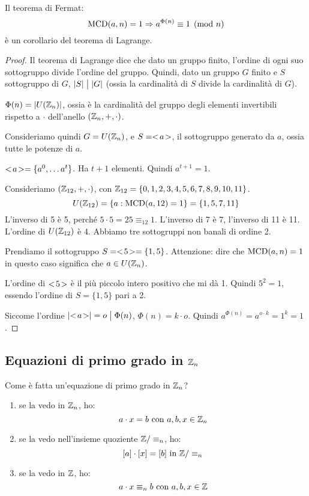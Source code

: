 \begin{prop}
Il teorema di Fermat:
\[
\operatorname{MCD}(a, n) = 1 \Rightarrow a^{\Phi(n)} \equiv 1 \pmod{n}
\]
\`e un corollario del teorema di Lagrange.
\end{prop}
\begin{proof}
Il teorema di Lagrange dice che dato un gruppo finito, l'ordine di ogni suo sottogruppo divide l'ordine del gruppo. Quindi, dato un gruppo $G$ finito e $S$ sottogruppo di $G$, $\left\lvert{S}\right\rvert \bigm| \left\lvert{G}\right\rvert $ (ossia la cardinalit\`a di $S$ divide la cardinalit\`a di $G$).

$\Phi(n) = \left\lvert{U(\mathbb{Z}_n)}\right\rvert$, ossia \`e la cardinalit\`a del gruppo degli elementi invertibili rispetto a $\cdot$ dell'anello $(\mathbb{Z}_n, +, \cdot)$.

Consideriamo quindi $G = U(\mathbb{Z}_n)$, e $S = <\!{a}\!>$, il sottogruppo generato da $a$, ossia tutte le potenze di $a$.

$<\!{a}\!> = \{ a^0, \dots a^t \}$. Ha $t + 1$ elementi. Quindi $a^{t+1} = 1$.

Consideriamo $(\mathbb{Z}_{12}, +, \cdot)$, con $\mathbb{Z}_{12} = \{0,1,2,3,4,5,6,7,8,9,10,11\}$.
\[
U(\mathbb{Z}_{12}) = \{ a : \operatorname{MCD}(a, 12) = 1\} = \{ 1, 5, 7, 11 \}
\]
L'inverso di 5 \`e 5, perch\'e $5 \cdot 5 = 25 \equiv_{12} 1$. L'inverso di 7 \`e 7, l'inverso di 11 \`e 11. L'ordine di $U(\mathbb{Z}_{12})$ \`e 4. Abbiamo tre sottogruppi non banali di ordine 2.

Prendiamo il sottogruppo $S = <\!{5}\!> = \{ 1, 5 \}$. Attenzione: dire che $\operatorname{MCD}(a, n) = 1$ in questo caso significa che $a \in U(\mathbb{Z}_n)$.

L'ordine di $<\!{5}\!>$ \`e il pi\`u piccolo intero positivo che mi d\`a 1. Quindi $5^2 = 1$, essendo l'ordine di $S = \{ 1, 5 \}$ pari a 2.

Siccome l'ordine $\left\lvert{<\!{a}\!>}\right\rvert = o \bigm| \Phi(n)$, $\Phi(n) = k \cdot o$. Quindi $a^{\Phi(n)} = a^{o \cdot k} = 1^k = 1$.
\end{proof}
\subsection{Equazioni di primo grado in $\mathbb{Z}_n$}

Come \`e fatta un'equazione di primo grado in $\mathbb{Z}_n$?

\begin{enumerate}
    \item\label{itm:equazioni_interi_modulo} se la vedo in $\mathbb{Z}_n$, ho:
    \[
    a \cdot x = b \text{ con } a, b, x \in \mathbb{Z}_n
    \]
    \item\label{itm:equazioni_interi_quoziente} se la vedo nell'insieme quoziente $\mathbb{Z} / \equiv_n$, ho:
    \[
    [a] \cdot [x] = [b] \text{ in } \mathbb{Z} / \equiv_n
    \]
    \item\label{itm:equazioni_interi} se la vedo in $\mathbb{Z}$, ho:
    \[
    a \cdot x \equiv_n b \text{ con } a, b, x \in \mathbb{Z}
    \]
\end{enumerate}

